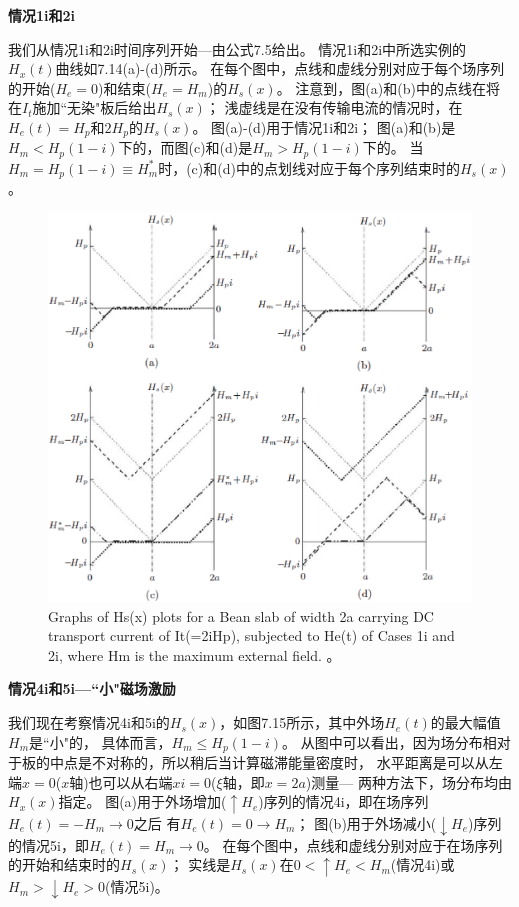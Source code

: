 \textbf{情况1i和2i}

我们从情况1i和2i时间序列开始---由公式7.5给出。
情况1i和2i中所选实例的$H_x(t)$曲线如7.14(a)-(d)所示。
在每个图中，点线和虚线分别对应于每个场序列的开始($H_e = 0$)和结束($H_e = H_m$)的$H_s(x)$。
注意到，图(a)和(b)中的点线在将在$I_t$施加``无染"板后给出$H_s(x)$；
浅虚线是在没有传输电流的情况时，在$H_e(t)=H_p$和$2H_p$的$H_s(x)$。
图(a)-(d)用于情况1i和2i； 图(a)和(b)是$H_m<H_p(1-i)$下的，而图(c)和(d)是$H_m> H_p(1-i)$下的。
当$H_m = H_p(1-i)\equiv H_m^*$时，(c)和(d)中的点划线对应于每个序列结束时的$H_s(x)$。
\begin{figure}[htbp]
	\centering
	\includegraphics[scale=0.6]{chpt7/figs/fig7.14.eps}
	\caption{Graphs of Hs(x) plots for a Bean slab of width 2a carrying DC transport
		current of It(=2iHp), subjected to He(t) of Cases 1i and 2i, where Hm is the maximum
		external field. 。}
\end{figure}

\textbf{情况4i和5i---``小"磁场激励}

我们现在考察情况4i和5i的$H_s(x)$，如图7.15所示，其中外场$H_e(t)$的最大幅值$H_m$是``小"的，
具体而言，$H_m\le H_p(1-i)$。
从图中可以看出，因为场分布相对于板的中点是不对称的，所以稍后当计算磁滞能量密度时，
水平距离是可以从左端$x = 0$($x$轴)也可以从右端$xi= 0$($\xi$轴，即$x=2a$)测量---
两种方法下，场分布均由$H_x(x)$指定。
图(a)用于外场增加($\uparrow H_e$)序列的情况4i，即在场序列$H_e(t)=-H_m\rightarrow 0$之后
有$H_e(t)= 0\rightarrow H_m$；
图(b)用于外场减小($\downarrow H_e$)序列的情况5i，即$H_e(t)= H_m\rightarrow 0$。
在每个图中，点线和虚线分别对应于在场序列的开始和结束时的$H_s(x)$；
实线是$H_s(x)$在$0<\uparrow H_e<H_m$(情况4i)或$H_m>\downarrow H_e> 0$(情况5i)。

